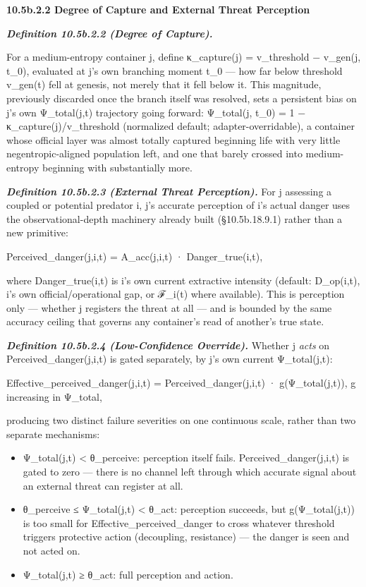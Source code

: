 \documentclass[
]{article}
\begin{document}
\textbf{10.5b.2.2 Degree of Capture and External Threat Perception}

\emph{\textbf{Definition 10.5b.2.2 (Degree of Capture).}}

For a medium-entropy container j, define κ\_capture(j) = v\_threshold −
v\_gen(j, t\_0), evaluated at j's own branching moment t\_0 --- how far
below threshold v\_gen(t) fell at genesis, not merely that it fell below
it. This magnitude, previously discarded once the branch itself was
resolved, sets a persistent bias on j's own Ψ\_total(j,t) trajectory
going forward: Ψ\_total(j, t\_0) = 1 − κ\_capture(j)/v\_threshold
(normalized default; adapter-overridable), a container whose official
layer was almost totally captured beginning life with very little
negentropic-aligned population left, and one that barely crossed into
medium-entropy beginning with substantially more.

\emph{\textbf{Definition 10.5b.2.3 (External Threat Perception).}} For j
assessing a coupled or potential predator i, j's accurate perception of
i's actual danger uses the observational-depth machinery already built
(§10.5b.18.9.1) rather than a new primitive:

Perceived\_danger(j,i,t) = A\_acc(j,i,t) · Danger\_true(i,t),

where Danger\_true(i,t) is i's own current extractive intensity
(default: D\_op(i,t), i's own official/operational gap, or ℱ\_i(t) where
available). This is perception only --- whether j registers the threat
at all --- and is bounded by the same accuracy ceiling that governs any
container's read of another's true state.

\emph{\textbf{Definition 10.5b.2.4 (Low-Confidence Override).}} Whether
j \emph{acts} on Perceived\_danger(j,i,t) is gated separately, by j's
own current Ψ\_total(j,t):

Effective\_perceived\_danger(j,i,t) = Perceived\_danger(j,i,t) ·
g(Ψ\_total(j,t)), g increasing in Ψ\_total,

producing two distinct failure severities on one continuous scale,
rather than two separate mechanisms:

\begin{itemize}
\item
  Ψ\_total(j,t) \textless{} θ\_perceive: perception itself fails.
  Perceived\_danger(j,i,t) is gated to zero --- there is no channel left
  through which accurate signal about an external threat can register at
  all.
\item
  θ\_perceive ≤ Ψ\_total(j,t) \textless{} θ\_act: perception succeeds,
  but g(Ψ\_total(j,t)) is too small for Effective\_perceived\_danger to
  cross whatever threshold triggers protective action (decoupling,
  resistance) --- the danger is seen and not acted on.
\item
  Ψ\_total(j,t) ≥ θ\_act: full perception and action.
\end{itemize}
\end{document}
